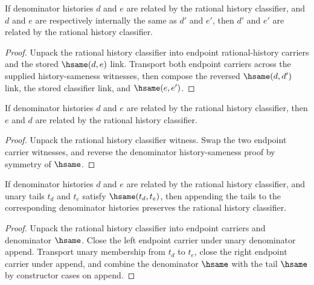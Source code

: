 \begin{theorem}
\label{thm:rat-history-classifier-hsame-transport}
If denominator histories \(d\) and \(e\) are related by the rational history
classifier, and \(d\) and \(e\) are respectively internally the same as
\(d'\) and \(e'\), then \(d'\) and \(e'\) are related by the rational history
classifier.
\end{theorem}
\begin{proof}
Unpack the rational history classifier into endpoint rational-history carriers
and the stored \(\hsame(d,e)\) link. Transport both endpoint carriers across
the supplied history-sameness witnesses, then compose the reversed
\(\hsame(d,d')\) link, the stored classifier link, and \(\hsame(e,e')\).
\end{proof}

\begin{theorem}
\label{thm:rat-history-classifier-symmetry}
If denominator histories \(d\) and \(e\) are related by the rational history
classifier, then \(e\) and \(d\) are related by the rational history classifier.
\end{theorem}
\begin{proof}
Unpack the rational history classifier witness. Swap the two endpoint carrier
witnesses, and reverse the denominator history-sameness proof by symmetry of
\(\hsame\).
\end{proof}

\begin{theorem}
\label{thm:rat-history-classifier-append-unary-denominator-closed}
If denominator histories \(d\) and \(e\) are related by the rational history
classifier, and unary tails \(t_d\) and \(t_e\) satisfy \(\hsame(t_d,t_e)\),
then appending the tails to the corresponding denominator histories preserves
the rational history classifier.
\end{theorem}
\begin{proof}
Unpack the rational history classifier into endpoint carriers and denominator
\(\hsame\). Close the left endpoint carrier under unary denominator append.
Transport unary membership from \(t_d\) to \(t_e\), close the right endpoint
carrier under append, and combine the denominator \(\hsame\) with the tail
\(\hsame\) by constructor cases on append.
\end{proof}

